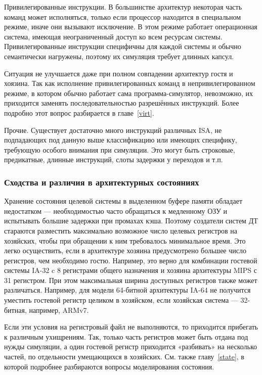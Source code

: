 \begin{description*}
    \item[Привилегированные инструкции.] В большинстве архитектур некоторая часть команд может исполняться, только если процессор находится в специальном режиме, иначе они вызывают исключение. В этом режиме работает операционная система, имеющая неограниченный доступ ко всем ресурсам системы. Привилегированные инструкции специфичны для каждой системы и обычно семантически нагружены, поэтому их симуляция требует длинных капсул.
    
    Ситуация не улучшается даже при полном совпадении архитектур гостя и хоязина. Так как исполнение привилегированных команд в непривилегированном режиме, в котором обычно работает сама программа-симулятор, невозможно, их приходится заменять последовательностью разрешённых инструкций. Более подробно этот вопрос разбирается в главе~\ref{virt}.

    \item[Прочие.] Существует достаточно много инструкций различных ISA, не подпадающих под данную выше классификацию или имеющих специфику, требующую особого внимания при симуляции. Это могут быть строковые, предикатные, длинные инструкций, слоты задержки у переходов и т.п.
\end{description*}


\subsubsection{Сходства и различия в архитектурных состояниях}

Хранение состояния целевой системы в выделенном буфере памяти обладает недостатком — необходимостью часто обращаться к медленному ОЗУ и испытывать большие задержки при промахах кэша. Поэтому создатели систем ДТ стараются разместить максимально возможное число целевых регистров на хозяйских, чтобы при обращении к ним требовалось минимальное время. Это легко осуществить, если в архитектуре хозяина предусмотрено большее число регистров, чем необходимо гостю. Например, это верно для комбинации гостевой системы IA-32 c 8 регистрами общего назначения и хозяина архитектуры MIPS с 31 регистром. При этом максимальная ширина доступных регистров также может различаться. Например, для модели 64-битной архитектуры IA-64 не получится уместить гостевой регистр целиком в хозяйском, если хозяйская система — 32-битная, например, ARMv7.

Если эти условия на регистровый файл не выполняются, то приходится прибегать к различным ухищрениям. Так, только часть регистров может быть отдана под нужды симуляции, а один гостевой регистр приходится «разбивать» на несколько частей, по отдельности умещающихся в хозяйских. См. также главу~\ref{state}, в которой подробнее разбираются вопросы моделирования состояния.

